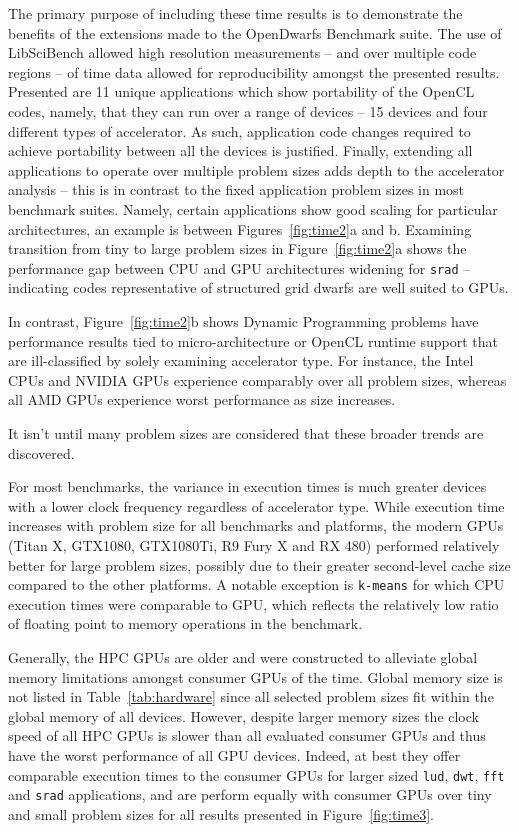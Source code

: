 \documentclass[../document.tex]{subfiles}
\begin{document}
The primary purpose of including these time results is to demonstrate the benefits of the extensions made to the OpenDwarfs Benchmark suite.
The use of LibSciBench allowed high resolution measurements -- and over multiple code regions -- of time data allowed for reproducibility amongst the presented results.
Presented are 11 unique applications which show portability of the OpenCL codes, namely, that they can run over a range of devices -- 15 devices and four different types of accelerator.
As such, application code changes required to achieve portability between all the devices is justified.
Finally, extending all applications to operate over multiple problem sizes adds depth to the accelerator analysis -- this is in contrast to the fixed application problem sizes in most benchmark suites.
Namely, certain applications show good scaling for particular architectures, an example is between Figures~\ref{fig:time2}a and b.
Examining transition from tiny to large problem sizes in Figure~\ref{fig:time2}a shows the performance gap between CPU and GPU architectures widening for {\tt srad} -- indicating codes representative of structured grid dwarfs are well suited to GPUs.

In contrast, Figure~\ref{fig:time2}b shows Dynamic Programming problems have performance results tied to micro-architecture or OpenCL runtime support that are ill-classified by solely examining accelerator type.
For instance, the Intel CPUs and NVIDIA GPUs experience comparably over all problem sizes, whereas all AMD GPUs experience worst performance as size increases.

It isn't until many problem sizes are considered that these broader trends are discovered.

For most benchmarks, the variance in execution times is much greater devices with a lower clock frequency regardless of accelerator type.
While execution time increases with problem size for all benchmarks and platforms, the modern GPUs (Titan X, GTX1080, GTX1080Ti, R9 Fury X and RX 480) performed relatively better for large problem sizes, possibly due to their greater second-level cache size compared to the other platforms.
A notable exception is {\tt k-means} for which CPU execution times were comparable to GPU, which reflects the relatively low ratio of floating point to memory operations in the benchmark.

Generally, the HPC GPUs are older and were constructed to alleviate global memory limitations amongst consumer GPUs of the time.
Global memory size is not listed in Table~\ref{tab:hardware} since all selected problem sizes fit within the global memory of all devices.
However, despite larger memory sizes the clock speed of all HPC GPUs is slower than all evaluated consumer GPUs and thus have the worst performance of all GPU devices.
Indeed, at best they offer comparable execution times to the consumer GPUs for larger sized {\tt lud}, {\tt dwt}, {\tt fft} and {\tt srad} applications, and are perform equally with consumer GPUs over tiny and small problem sizes for all results presented in Figure~\ref{fig:time3}.
\end{document}
